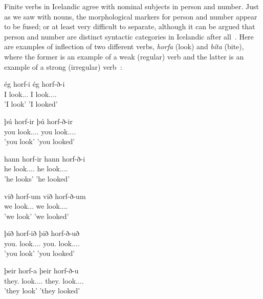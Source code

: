 \documentclass[12pt,%
    times,
]{lin-v2/lin}
\begin{document}
Finite verbs in Icelandic agree with nominal subjects in person and number. Just as we saw with nouns,
the morphological markers for person and number appear to be fused; or at least very difficult to separate,
although it can be argued that person and number are distinct syntactic categories
in Icelandic after all~\citep[8]{icelandic}. Here are examples of inflection of two
different verbs, \emph{horfa} (look) and \emph{bíta} (bite), where the former is an example
of a weak (regular) verb and the latter is an example of a strong (irregular) verb~\citep{icelandic}:
\begin{exe}
    \ex \begin{xlist}
        \item \gll ég horf-i ég horf-ð-i\\
                   I look.\First\Sg.\Prs.\Ind{} I look.\First.\Sg.\Pst.\Ind\\
              \trans 'I look' 'I looked'
        \item \gll þú horf-ir þú horf-ð-ir\\
                   you look.\Second.\Sg.\Prs.\Ind{} you look.\Second.\Sg.\Pst.\Ind\\
              \trans 'you look' 'you looked'
        \item \gll hann horf-ir hann horf-ð-i\\
                   he look.\Third.\Sg.\Prs.\Ind{} he look.\Third.\Sg.\Pst.\Ind\\
                   \trans 'he looks' 'he looked'\\
        \item \gll við horf-um við horf-ð-um\\
                   we look.\First\Sg.\Prs.\Ind{} we look.\First.\Sg.\Pl.\Ind\\
              \trans 'we look' 'we looked'
        \item \gll þið horf-ið þið horf-ð-uð\\
                   you.\Pl{} look.\Second.\Sg.\Prs.\Ind{} you.\Pl{} look.\Second.\Pl.\Pst.\Ind\\
              \trans 'you look' 'you looked'
        \item \gll þeir horf-a þeir horf-ð-u\\
                   they.\M{} look.\Third.\Sg.\Prs.\Ind{} they.\M{} look.\Third.\Pl.\Pst.\Ind\\
              \trans 'they look' 'they looked'\\
        \end{xlist}
\end{exe}
\end{document}
